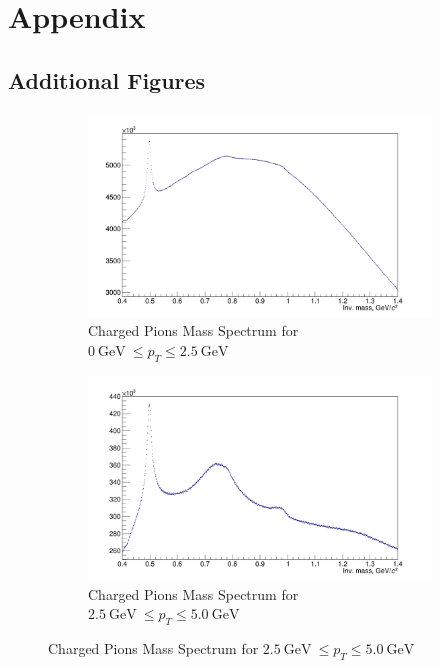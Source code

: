 \section{Appendix}
\subsection{Additional Figures}
\begin{figure}[h]
\begin{subfigure}[t]{0.5\linewidth}
\centering
\includegraphics[width=0.98\linewidth]{Figures/ChargedPioSpectra/ChPioMassSpectrum0_25.png}
\caption{Charged Pions Mass Spectrum for $0 \ \mathrm{GeV} \ \leq p_T \leq 2.5 \ \mathrm{GeV}$}
\label{fig:MPtChPio0_25}
\end{subfigure} \hspace{0.1cm}
\begin{subfigure}[t]{.5\linewidth}
\centering
\includegraphics[width=0.98\linewidth]{Figures/ChargedPioSpectra/ChPioMassSpectrum25_50.png}
\caption{Charged Pions Mass Spectrum for $2.5 \ \mathrm{GeV} \ \leq p_T \leq 5.0 \ \mathrm{GeV}$}
\label{fig:MPtChPio25_50}

\end{subfigure}
\end{figure}

